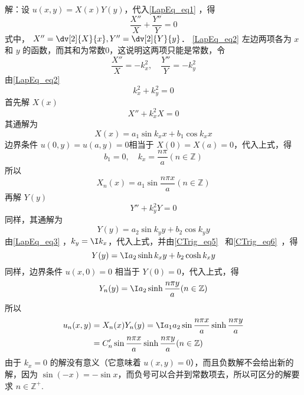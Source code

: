 解：设 $u(x,y)=X(x)Y(y)$，代入\autoref{LapEq_eq1} ，得
\begin{equation}\label{LapEq_eq2}
\frac{X''}{X}+\frac{Y''}{Y}=0
\end{equation}
式中， $X''=\dv[2]{X}{x},Y''=\dv[2]{Y}{y}$．
\autoref{LapEq_eq2} 左边两项各为 $x$ 和 $y$ 的函数，而其和为常数0，这说明这两项只能是常数，令
\begin{equation}
\frac{X''}{X}=-k_x^2,\quad \frac{Y''}{Y}=-k_y^2
\end{equation}
由\autoref{LapEq_eq2} 
\begin{equation}\label{LapEq_eq3}
k_x^2+k_y^2=0
\end{equation}
首先解 $X(x)$
\begin{equation}
X''+k_x^2X=0
\end{equation}
其通解为
\begin{equation}
X(x)=a_1\sin k_x x+b_1\cos k_x x
\end{equation}
边界条件 $u(0,y)=u(a,y)=0$相当于 $X(0)=X(a)=0$，代入上式，得
\begin{equation}
b_1=0,\quad k_x=\frac{n\pi}{a}(n\in \mathbb{Z})
\end{equation}
所以
\begin{equation}
X_n(x)=a_1\sin\frac{n\pi x}{a}(n\in \mathbb{Z})
\end{equation}
再解 $Y(y)$
\begin{equation}
Y''+k_y^2Y=0
\end{equation}
同样，其通解为
\begin{equation}
Y(y)=a_2\sin k_y y+b_2\cos k_y y
\end{equation}
由\autoref{LapEq_eq3} ，$k_y=\I k_x$，代入上式，并由\autoref{CTrig_eq5}~ 和\autoref{CTrig_eq6}~，得
\begin{equation}
Y(y)=\I a_2\sinh k_x y+b_2\cosh k_x y
\end{equation}
同样，边界条件 $u(x,0)=0$ 相当于 $Y(0)=0$，代入上式，得
\begin{equation}
Y_n(y)=\I a_2\sinh\frac{n\pi y}{a}(n\in \mathbb{Z})
\end{equation}
所以
\begin{equation}
\begin{aligned}
u_n(x,y)&=X_n(x)Y_n(y)=\I a_1a_2\sin\frac{n\pi x}{a}\sinh\frac{n\pi y}{a}\\
&=C'_n\sin\frac{n\pi x}{a}\sinh\frac{n\pi y}{a}(n\in\mathbb{Z})
\end{aligned}
\end{equation}
由于 $k_x=0$ 的解没有意义（它意味着 $u(x,y)=0$），而且负数解不会给出新的解，因为 $\sin(-x)=-\sin x$，而负号可以合并到常数项去，所以可区分的解要求 $n\in\mathbb{Z^+}$.

